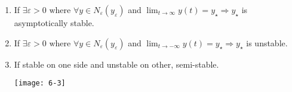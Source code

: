 \begin{enumerate}[label=\protect\circled{\alph*}]
	\item If $\exists \varepsilon > 0 \text{ where } \forall y \in N_{\varepsilon}(y_{\varepsilon})$ and $\lim_{t \to \infty} y(t) = y_{\star} \Rightarrow y_{\star}$ is asymptotically stable.
	\item If $\exists \varepsilon > 0 \text{ where } \forall y \in N_{\varepsilon}(y_{\varepsilon})$ and $\lim_{t \to -\infty} y(t) = y_{\star} \Rightarrow y_{\star}$ is unstable.
	\item If stable on one side and unstable on other, semi-stable.\\
	\begin{center}
		\texttt{[image: 6-3]}		
	\end{center}	
\end{enumerate}